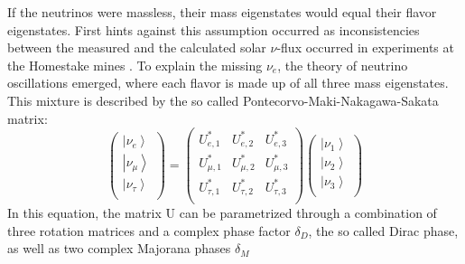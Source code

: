     
      If the neutrinos were massless, their mass eigenstates would equal their flavor eigenstates.
    First hints against this assumption occurred as inconsistencies between the measured and the calculated solar $\nu$-flux occurred in experiments at the Homestake mines \cite{homestake}. To explain the missing $\nu_{e}$, the theory of neutrino oscillations emerged, where each flavor is made up of all three mass eigenstates. This mixture is described by the so called Pontecorvo-Maki-Nakagawa-Sakata matrix:
        \begin{equation}
        \left(
        \begin{array}{c}
	 \left |\nu_e\right>\\
	 \left |\nu_\mu\right>\\
	 \left |\nu_\tau\right>\\
        \end{array}
        \right)
	 = \left(
	\begin{array}{ccc}
      	U^*_{e,1} & U^*_{e,2} & U^*_{e,3}\\
      	U^*_{\mu,1} & U^*_{\mu,2} & U^*_{\mu,3}\\
      	U^*_{\tau,1} & U^*_{\tau,2} & U^*_{\tau,3}\\
      	\end{array}
	\right)
	\left(
	\begin{array}{c}
      	\left|\nu_1\right>\\
      	\left|\nu_2\right>\\
      	\left|\nu_3\right>\\
    	 \end{array}
    	 \right)
    \end{equation}
    In this equation, the matrix U can be parametrized through a combination of three rotation matrices and a complex phase factor $\delta_D$, the so called Dirac phase, as well as two complex Majorana phases $\delta_M$
    
